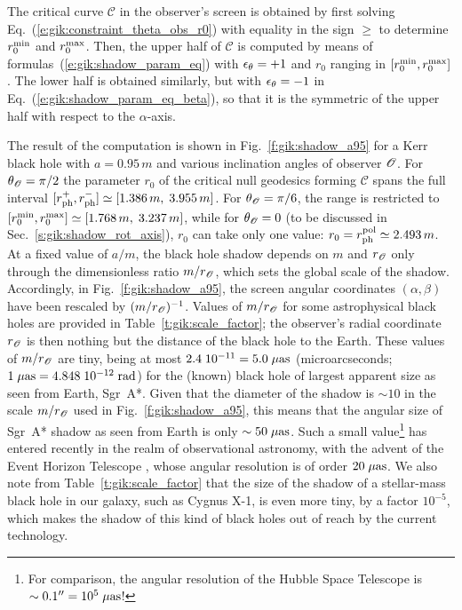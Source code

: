 The critical curve $\mathscr{C}$ in the observer's screen is obtained by first solving
Eq.~(\ref{e:gik:constraint_theta_obs_r0}) with equality in the sign $\geq$
to determine $r_0^{\rm min}$ and  $r_0^{\rm max}$. Then, the upper half of
$\mathscr{C}$ is computed by means of formulas~(\ref{e:gik:shadow_param_eq})
with $\epsilon_\theta=+1$ and $r_0$ ranging in $[r_0^{\rm min}, r_0^{\rm max}]$.
The lower half is obtained similarly, but with $\epsilon_\theta = -1$ in Eq.~(\ref{e:gik:shadow_param_eq_beta}),
so that it is the symmetric of the upper half with respect to the $\alpha$-axis.

The result of the computation is shown in
Fig.~\ref{f:gik:shadow_a95} for a Kerr black hole with
$a=0.95\, m$ and various inclination angles of observer $\mathscr{O}$.
For $\theta_{\mathscr{O}}=\pi/2$ the parameter $r_0$ of the critical null geodesics
forming $\mathscr{C}$ spans the full interval
$[r_{\rm ph}^+, r_{\rm ph}^-] \simeq [1.386\, m,\; 3.955\, m]$.
For $\theta_{\mathscr{O}}=\pi/6$, the range is restricted to
$[r_0^{\rm min}, r_0^{\rm max}] \simeq [1.768\, m,\;   3.237\, m]$,
while for $\theta_{\mathscr{O}}=0$ (to be discussed in Sec.~\ref{s:gik:shadow_rot_axis}),
$r_0$ can take only one value:
$r_0 = r_{\rm ph}^{\rm pol} \simeq 2.493\, m$.
At a fixed value of $a/m$, the black hole shadow depends on $m$ and $r_{\mathscr{O}}$
only through the dimensionless ratio $m/r_{\mathscr{O}}$, which sets the global scale of the shadow.
Accordingly, in Fig.~\ref{f:gik:shadow_a95}, the screen angular coordinates $(\alpha,\beta)$ have
been rescaled by $(m/r_{\mathscr{O}})^{-1}$.
Values of $m/r_{\mathscr{O}}$ for some astrophysical black holes are provided
in Table~\ref{t:gik:scale_factor}; the observer's radial coordinate $r_{\mathscr{O}}$ is then
nothing but the distance of the black hole to the Earth. These values of
$m/r_{\mathscr{O}}$ are tiny, being at most $2.4\; 10^{-11} = 5.0 \; \mu{\rm as}$
(microarcseconds; $1\; \mu{\rm as} = 4.848\; 10^{-12}\; {\rm rad}$)
for
the (known) black hole of largest apparent size as seen from Earth, Sgr~A*.
Given that the diameter of the shadow is $\sim 10$ in the scale
$m/r_{\mathscr{O}}$ used in Fig.~\ref{f:gik:shadow_a95}, this means that the
angular size of Sgr~A* shadow as seen from Earth is only $\sim 50\; \mu{\rm as}$.
Such a small value\footnote{For comparison, the angular resolution of the
Hubble Space Telescope is $\sim 0.1'' = 10^5\; \mu{\rm as}$!}
has entered recently in the realm of observational astronomy,
with the advent of the Event Horizon Telescope \cite{EHT19a,Wielg_al20},
whose angular resolution is of order $20\; \mu{\rm as}$.
We also note from Table~\ref{t:gik:scale_factor} that the size of the shadow
of a stellar-mass black hole in our galaxy, such as Cygnus X-1, is even more tiny,
by a factor $10^{-5}$, which makes the shadow of this kind of black holes out of reach
by the current technology.

